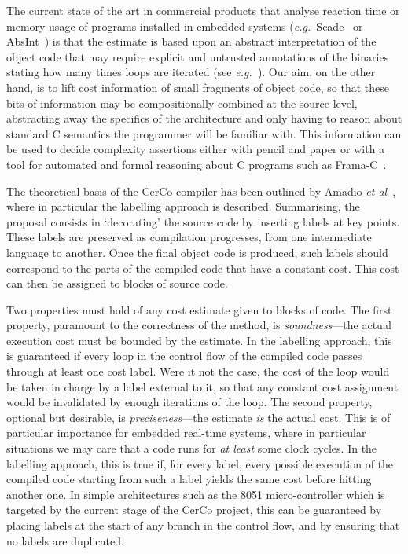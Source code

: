 \documentclass[submission,copyright,creativecommons]{eptcs}
\theoremstyle{definition}
\newcommand{\eg}{\emph{e.g.\ }}
\begin{document}
The current state of the art in commercial products that analyse
reaction time or memory usage of programs installed in embedded systems
(\eg Scade~\cite{scade} or AbsInt~\cite{absint}) is that the estimate is based
upon an abstract interpretation of the object code that may require explicit and
untrusted annotations of the binaries stating how many times loops are iterated
(see \eg \cite{WCETsurvey}). Our aim, on the other hand, is to lift cost information
of small fragments of object code, so that these bits of
information may be compositionally combined at the source level,
abstracting away the specifics of the architecture and only having to reason
about standard C semantics the programmer will be familiar with. This
information can be used to decide complexity
assertions either with pencil and paper or
with a tool for automated and formal reasoning about C programs such as
Frama-C~\cite{framac}.

The theoretical basis of the CerCo compiler has been outlined by Amadio \emph{et al}~\cite{labeling},
where in particular the labelling approach is described.
Summarising, the proposal consists in `decorating' the source code by inserting
labels at key points.
These labels are preserved as compilation progresses, from one intermediate language to another.
Once the final object code is produced, such labels should correspond to the parts of the compiled code that have a constant cost. This cost can then be assigned to blocks of source code.

Two properties must hold of any cost estimate given to blocks of code.
The first property, paramount to the correctness of the method, is \emph{soundness}---the actual execution cost must be bounded by the estimate.
In the labelling approach, this is guaranteed if every loop in the control flow of the compiled code passes through at least one cost label. Were it not the case, the cost of the loop would be taken in charge by a label external to it, so that any constant cost assignment
would be invalidated by enough iterations of the loop.
The second property, optional but desirable, is \emph{preciseness}---the estimate
\emph{is} the actual cost. This is of particular importance for embedded real-time
systems, where in particular situations we may care that a code runs for \emph{at least}
some clock cycles.
In the labelling approach, this is true if, for every label, every possible execution of the compiled code starting from such a label yields the same cost before hitting another one.
In simple architectures such as the 8051 micro-controller which is targeted by the
current stage of the CerCo project, this can be guaranteed by placing labels at the
start of any branch in the control flow, and by ensuring that no labels are duplicated.
\end{document}
